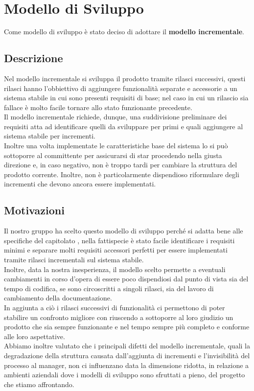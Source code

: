 \section{Modello di Sviluppo}
Come modello di sviluppo è stato deciso di adottare il \textbf{modello incrementale}.
\subsection{Descrizione}
Nel modello incrementale si sviluppa il prodotto tramite rilasci successivi, questi rilasci hanno l'obbiettivo di aggiungere funzionalità separate e accessorie 
a un sistema stabile in cui sono presenti requisiti di base; nel caso in cui un rilascio sia fallace è molto facile tornare allo stato funzionante precedente.\\
Il modello incrementale richiede, dunque, una suddivisione preliminare dei requisiti atta ad identificare quelli da sviluppare per primi e quali aggiungere al sistema 
stabile per incrementi. \\
Inoltre una volta implementate le caratteristiche base del sistema lo si può sottoporre al committente per assicurarsi di star procedendo nella giusta direzione e, in caso negativo,
non è troppo tardi per cambiare la struttura del prodotto corrente. Inoltre, non è particolarmente dispendioso riformulare degli incrementi che devono ancora essere implementati. 

\subsection{Motivazioni}
Il nostro gruppo ha scelto questo modello di sviluppo perché si adatta bene alle specifiche del capitolato \NomeProgetto{},
nella fattispecie  è stato facile identificare i requisiti minimi e separare molti requisiti accessori perfetti per essere implementati
tramite rilasci incrementali sul sistema stabile.\\
Inoltre, data la nostra inesperienza, il modello scelto permette a eventuali cambiamenti in corso d'opera di essere poco dispendiosi dal punto di vista
sia del tempo di codifica, se sono circoscritti a singoli rilasci, sia del lavoro di cambiamento della documentazione. \\
In aggiunta a ciò i rilasci successivi di funzionalità ci permettono di poter stabilire un confronto migliore con \Proponente{}
riuscendo a sottoporre al loro giudizio un prodotto che sia sempre funzionante e nel tempo sempre più completo e conforme alle loro aspettative. \\
Abbiamo inoltre valutato che i principali difetti del modello incrementale, quali la degradazione della struttura causata dall'aggiunta di 
incrementi e l'invisibilità del processo al manager, non ci influenzano data la dimensione ridotta, in relazione a 
ambienti aziendali dove i modelli di sviluppo sono sfruttati a pieno, del progetto che stiamo affrontando.
 

